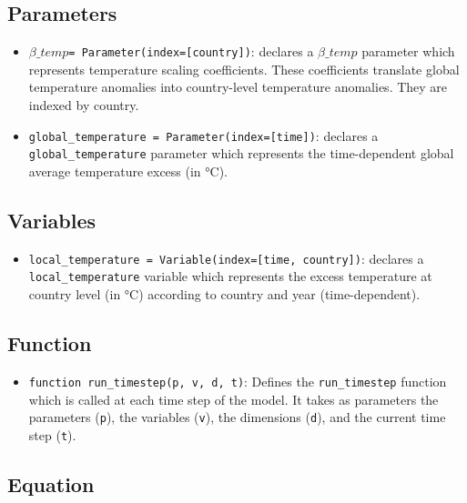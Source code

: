 \documentclass[
]{article}
\providecommand{\tightlist}{%
  \setlength{\itemsep}{0pt}\setlength{\parskip}{0pt}}
\begin{document}
\subsection{Parameters}\label{parameters-8}

\begin{itemize}
\item
  \(\beta\_{temp}\)\texttt{=\ Parameter(index={[}country{]})}: declares
  a \(\beta\_{temp}\) parameter which represents temperature scaling
  coefficients. These coefficients translate global temperature
  anomalies into country-level temperature anomalies. They are indexed
  by country.
\item
  \texttt{global\_temperature\ =\ Parameter(index={[}time{]})}: declares
  a \texttt{global\_temperature} parameter which represents the
  time-dependent global average temperature excess (in °C).
\end{itemize}

\subsection{Variables}\label{variables-5}

\begin{itemize}
\tightlist
\item
  \texttt{local\_temperature\ =\ Variable(index={[}time,\ country{]})}:
  declares a \texttt{local\_temperature} variable which represents the
  excess temperature at country level (in °C) according to country and
  year (time-dependent).
\end{itemize}

\subsection{Function}\label{function}

\begin{itemize}
\tightlist
\item
  \texttt{function\ run\_timestep(p,\ v,\ d,\ t)}: Defines the
  \texttt{run\_timestep} function which is called at each time step of
  the model. It takes as parameters the parameters (\texttt{p}), the
  variables (\texttt{v}), the dimensions (\texttt{d}), and the current
  time step (\texttt{t}).
\end{itemize}

\subsection{Equation}\label{equation}
\end{document}
